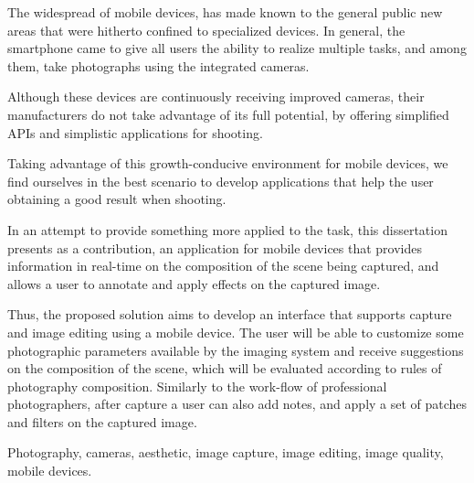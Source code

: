 \abstractEN

The widespread of mobile devices, has made known to the general public new areas that were hitherto confined to specialized devices. In general, the smartphone came to give all users the ability to realize multiple tasks, and among them, take photographs using the integrated cameras.


Although these devices are continuously receiving improved cameras, their manufacturers do not take advantage of its full potential, by offering simplified APIs and simplistic applications for shooting.


Taking advantage of this growth-conducive environment for mobile devices, we find ourselves in the best scenario to develop applications that help the user obtaining a good result when shooting.


In an attempt to provide something more applied to the task, this dissertation presents as a contribution, an application for mobile devices that provides information in real-time on the composition of the scene being captured, and allows a user to annotate and apply effects on the captured image.

Thus, the proposed solution aims to develop an interface that supports capture and image editing using a mobile device. The user will be able to customize some photographic parameters available by the imaging system and receive suggestions on the composition of the scene, which will be evaluated according to rules of photography composition. Similarly to the work-flow of professional photographers, after capture a user can also add notes, and apply a set of patches and filters on the captured image.

\begin{keywords}
Photography, cameras, aesthetic, image capture, image editing, image quality, mobile devices.
\end{keywords}
